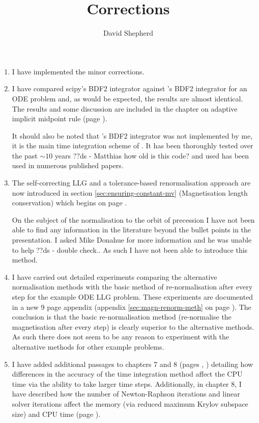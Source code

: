 \documentclass[12pt,a4paper,pdftex]{article}
\title{Corrections}
\author{David Shepherd}
\begin{document}
\maketitle

\begin{enumerate}
\item I have implemented the minor corrections.

\item I have compared scipy's \vode BDF2 integrator against \oomph's BDF2 integrator for an ODE problem and, as would be expected, the results are almost identical. The results and some discussion are included in the chapter on adaptive implicit midpoint rule (page \pageref{fig:vode-osc-example}).

It should also be noted that \oomph's BDF2 integrator was not implemented by me, it is the main time integration scheme of \oomph.
It has been thoroughly tested over the past $\sim 10$ years ??ds - Matthias how old is this code? and used has been used in numerous published papers.

\item The self-correcting LLG and a tolerance-based renormalisation approach are now introduced in section \ref{sec:ensuring-constant-mv} (Magnetisation length conservation) which begins on page \pageref{alt-ml-renorm-intro}.

  On the subject of the normalisation to the orbit of precession I have not been able to find any information in the literature beyond the bullet points in the presentation.
I asked Mike Donahue for more information and he was unable to help ??ds - double check..
As such I have not been able to introduce this method.

\item I have carried out detailed experiments comparing the alternative normalisation methods with the basic method of re-normalisation after every step for the example ODE LLG problem.
  These experiments are documented in a new 9 page appendix (appendix \ref{sec:magn-renorm-meth} on page \pageref{sec:magn-renorm-meth}).
The conclusion is that the basic re-normalisation method (re-normalise the magnetisation after every step) is clearly superior to the alternative methods.
As such there does not seem to be any reason to experiment with the alternative methods for other example problems.

\item I have added additional passages to chapters 7 and 8 (pages \pageref{cpu-correction-1}, \pageref{cpu-correction-2}) detailing how differences in the accuracy of the time integration method affect the CPU time via the ability to take larger time steps.
  Additionally, in chapter 8, I have described how the number of Newton-Raphson iterations and linear solver iterations affect the memory (via reduced maximum Krylov subspace size) and CPU time (page \pageref{mem-cpu-solver-correction}).


\end{enumerate}
\end{document}

